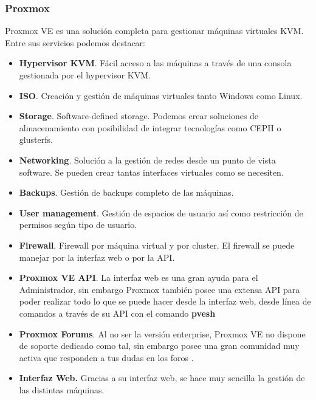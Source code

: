                 \subsubsection{Proxmox}
                \begin{text}
                        Proxmox VE es una solución completa para gestionar máquinas virtuales KVM. Entre sus servicios podemos destacar:
                        \begin{itemize}
                                \item \textbf{Hypervisor KVM}. Fácil acceso a las máquinas a través de una consola gestionada por el hypervisor KVM.
                                \item \textbf{ISO}. Creación y gestión de máquinas virtuales tanto Windows como Linux.
                                \item \textbf{Storage}. Software-defined storage. Podemos crear soluciones de almacenamiento con posibilidad de integrar tecnologías como CEPH o glusterfs.
                                \item \textbf{Networking}. Solución a la gestión de redes desde un punto de vista software. Se pueden crear tantas interfaces virtuales como se necesiten.
                                \item \textbf{Backups}. Gestión de backups completo de las máquinas.
                                \item \textbf{User management}. Gestión de espacios de usuario así como restricción de permisos según tipo de usuario.
                                \item \textbf{Firewall}. Firewall por máquina virtual y por cluster. El firewall se puede manejar por la interfaz web o por la API.
                                \item \textbf{Proxmox VE API}. La interfaz web es una gran ayuda para el Administrador, sin embargo Proxmox también posee una extensa API \cite{ProxmoxAPI:online} para poder realizar todo lo que se puede hacer desde la interfaz web, desde línea de comandos a través de su API con el comando \textbf{pvesh}
                                \item \textbf{Proxmox Forums}. Al no ser la versión enterprise, Proxmox VE no dispone de soporte dedicado como tal, sin embargo posee una gran comunidad muy activa que responden a tus dudas en los foros \cite{ProxmoxForum:online}.
                                \item \textbf{Interfaz Web.} Gracias a su interfaz web, se hace muy sencilla la gestión de las distintas máquinas.

\end{itemize}
\end{text}
